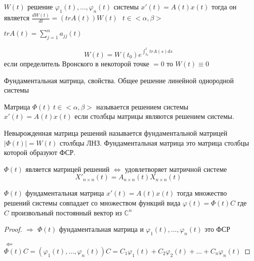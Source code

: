 \begin{theorem}
  $W(t)$ решение $\varphi_1(t), \ldots, \varphi_n(t)$ системы $x'(t) = A(t)x(t)$
  тогда он является $\frac{dW(t)}{dt} = (trA(t))W(t) ~~~ t \in <\alpha, \beta>$

  $trA(t) = \sum_{j=1}^n a_{jj}(t)$
\end{theorem}

\begin{block}
  $$
  W(t) = W(t_0)e^{\int_{t_0}^t tr A(s)ds}
  $$
  если определитель Вронского в некоторой точке $= 0$ то $W(t) \equiv 0$
\end{block}

\begin{title}[\Large]
  Фундаментальная матрица, свойства. Общее решение линейной однородной системы
\end{title}

\begin{define}
  Матрица $\Phi(t) ~ t \in <\alpha, \beta>$ называется решением системы
  $x'(t) = A(t)x(t)$ если столбцы матрицы являются решением системы.
\end{define}

\begin{define}
  Невырожденная матрица решений называется фундаментальной матрицей
  $|\Phi(t)| = W(t)$ столбцы ЛНЗ. Фундаментальная матрица это матрица столбцы
  которой образуют ФСР.
\end{define}

\begin{block}[Утверждение]
  $\Phi(t)$ является матрицей решений $\Leftrightarrow$ удовлетворяет
  матричной системе
  $$
  X'_{n \times n}(t) = A_{n \times n}(t) X_{n \times n}(t)
  $$
\end{block}

\begin{theorem}
  $\Phi(t)$ фундаментальная матрица $x'(t) = A(t)x(t)$
  тогда множество решений системы совпадает со множеством функций вида
  $\varphi(t) = \Phi(t)C$ где $C$ произвольный постоянный вектор из
  $\mathbb{C}^n$
\end{theorem}

\begin{proof}
  $\Rightarrow$ $\Phi(t)$ фундаментальная матрица и $\varphi_1(t), \ldots,
  \varphi_n(t)$ это ФСР

  $\Leftarrow$ $\Phi(t)C = (\varphi_1(t), \ldots, \varphi_n(t))C = C_1
  \varphi_1(t) + C_2 \varphi_2(t) + \ldots + C_n \varphi_n(t)$
\end{proof}

